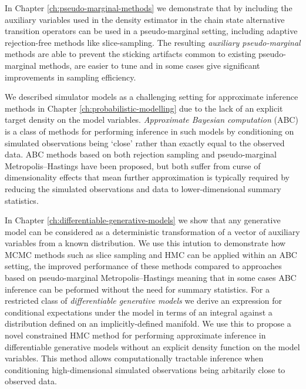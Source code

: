 In Chapter \ref{ch:pseudo-marginal-methods} we demonstrate that by including the auxiliary variables used in the density estimator in the chain state alternative transition operators can be used in a pseudo-marginal setting, including adaptive rejection-free methods like slice-sampling. The resulting \emph{auxiliary pseudo-marginal} methods are able to prevent the sticking artifacts common to existing pseudo-marginal methods, are easier to tune and in some cases give significant improvements in sampling efficiency.

We described simulator models as a challenging setting for approximate inference methods in Chapter \ref{ch:probabilistic-modelling} due to the lack of an explicit target density on the model variables. \emph{Approximate Bayesian computation}  (\ac{ABC}) is a class of methods for performing inference in such models by conditioning on simulated observations being `close' rather than exactly equal to the observed data. \ac{ABC} methods based on both rejection sampling and pseudo-marginal Metropolis--Hastings have been proposed, but both suffer from curse of dimensionality effects that mean further approximation is typically required by reducing the simulated observations and data to lower-dimensional summary statistics.

In Chapter \ref{ch:differentiable-generative-models} we show that any generative model can be considered as a deterministic transformation of a vector of auxiliary variables from a known distribution. We use this intution to demonstrate how \ac{MCMC} methods such as slice sampling and \ac{HMC} can be applied within an \ac{ABC} setting, the improved performance of these methods compared to approaches based on pseudo-marginal Metropolis--Hastings meaning that in some cases \ac{ABC} inference can be peformed without the need for summary statistics. For a restricted class of \emph{differentiable generative models} we derive an expression for conditional expectations under the model in terms of an integral against a distribution defined on an implicitly-defined manifold. We use this to propose a novel constrained \ac{HMC} method for performing approximate inference in differentiable generative models without an explicit density function on the model variables. This method allows computationally tractable inference when conditioning high-dimensional simulated observations being arbitarily close to observed data.

